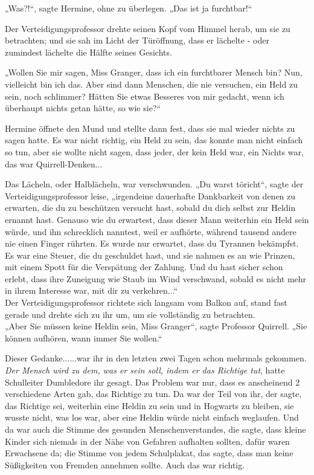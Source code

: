 {„Was?!“, sagte Hermine, ohne zu überlegen. „Das ist ja furchtbar!“

Der Verteidigungsprofessor drehte seinen Kopf vom Himmel herab, um sie zu betrachten; und sie sah im Licht der Türöffnung, dass er lächelte - oder zumindest lächelte die Hälfte seines Gesichts.

„Wollen Sie mir sagen, Miss Granger, dass ich ein furchtbarer Mensch bin? Nun, vielleicht bin ich das. Aber sind dann Menschen, die nie versuchen, ein Held zu sein, noch schlimmer? Hätten Sie etwas Besseres von mir gedacht, wenn ich überhaupt nichts getan hätte, so wie sie?“

Hermine öffnete den Mund und stellte dann fest, dass sie mal wieder nichts zu sagen hatte. Es war nicht richtig, ein Held zu sein, das konnte man nicht einfach so tun, aber sie wollte nicht sagen, dass jeder, der kein Held war, ein Nichts war, das war Quirrell-Denken...

Das Lächeln, oder Halblächeln, war verschwunden. „Du warst töricht“, sagte der Verteidigungsprofessor leise, „irgendeine dauerhafte Dankbarkeit von denen zu erwarten, die du zu beschützen versucht hast, sobald du dich selbst zur Heldin ernannt hast. Genauso wie du erwartest, dass dieser Mann weiterhin ein Held sein würde, und ihn schrecklich nanntest, weil er aufhörte, während tausend andere nie einen Finger rührten. Es wurde nur erwartet, dass du Tyrannen bekämpfst. Es war eine Steuer, die du geschuldet hast, und sie nahmen es an wie Prinzen, mit einem Spott für die Verspätung der Zahlung. Und du hast sicher schon erlebt, dass ihre Zuneigung wie Staub im Wind verschwand, sobald es nicht mehr in ihrem Interesse war, mit dir zu verkehren...“\\ Der Verteidigungsprofessor richtete sich langsam vom Balkon auf, stand fast gerade und drehte sich zu ihr um, um sie vollständig zu betrachten.\\ „Aber Sie müssen keine Heldin sein, Miss Granger“, sagte Professor Quirrell. „Sie können aufhören, wann immer Sie wollen.“

Dieser Gedanke......war ihr in den letzten zwei Tagen schon mehrmals gekommen. \emph{Der Mensch wird zu dem, was er sein soll, indem er das Richtige tut}, hatte Schulleiter Dumbledore ihr gesagt. Das Problem war nur, dass es anscheinend 2 verschiedene Arten gab, das Richtige zu tun. Da war der Teil von ihr, der sagte, das Richtige sei, weiterhin eine Heldin zu sein und in Hogwarts zu bleiben, sie wusste nicht, was los war, aber eine Heldin würde nicht einfach weglaufen. Und da war auch die Stimme des gesunden Menschenverstandes, die sagte, dass kleine Kinder sich niemals in der Nähe von Gefahren aufhalten sollten, dafür waren Erwachsene da; die Stimme von jedem Schulplakat, das sagte, dass man keine Süßigkeiten von Fremden annehmen sollte. Auch das war richtig.

}
